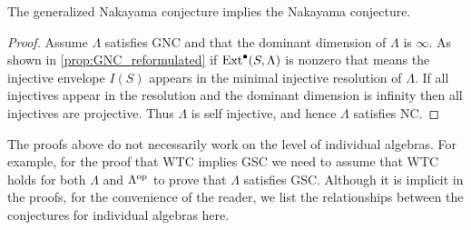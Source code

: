 %		
%		
%		
%		
%

\begin{prop}\cite{AR75} 
	The generalized Nakayama conjecture implies the Nakayama conjecture.
	\begin{proof}
		Assume $\Lambda$ satisfies GNC and that the dominant dimension of $\Lambda$ is $\infty$. As shown in \cref{prop:GNC_reformulated} if $\operatorname{Ext}^\bullet(S, \Lambda)$ is nonzero that means the injective envelope $I(S)$ appears in the minimal injective resolution of $\Lambda$. If all injectives appear in the resolution and the dominant dimension is infinity then all injectives are projective. Thus $\Lambda$ is self injective, and hence $\Lambda$ satisfies NC. 
	\end{proof}
\end{prop}

The proofs above do not necessarily work on the level of individual algebras. For example, for the proof that WTC implies GSC we need to assume that WTC holds for both $\Lambda$ and $\Lambda^{\operatorname{op}}$ to prove that $\Lambda$ satisfies GSC. Although it is implicit in the proofs, for the convenience of the reader, we list the relationships between the conjectures for individual algebras here.

